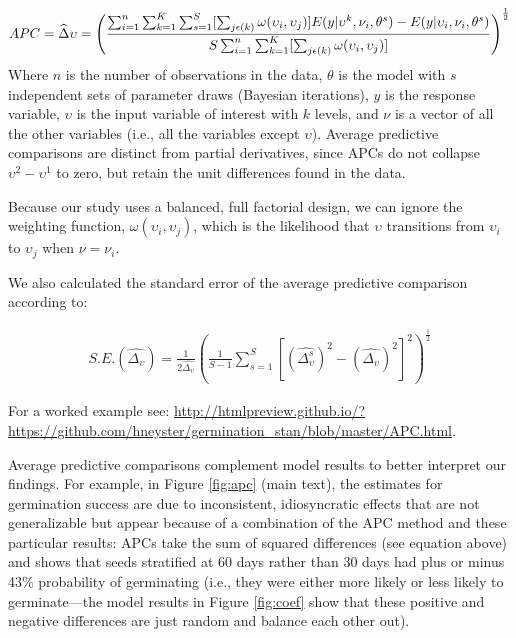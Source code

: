 \documentclass[12pt]{article}\usepackage[]{graphicx}\usepackage[]{color}
\begin{document}
\begin{align}
APC = \widehat{\Delta} \upsilon =  \left( \frac{\sum_{i=1}^{n} \sum_{k=1}^{K} \sum_{s=1}^{S} [\sum_{j\space \epsilon(k)} \omega(\upsilon_i,\upsilon_j)]E(y|\upsilon^{k}, \nu_i,\theta^s) - E(y|\upsilon_i, \nu_i,\theta^s)} {S \sum_{i=1}^{n} \sum_{k=1}^{K}[\sum_{j\space \epsilon(k)} \omega(\upsilon_i,\upsilon_j)]} \right) ^{\frac{1}{2}}
\end{align}
Where $n$ is the number of observations in the data, $\theta$ is the model with $s$ independent sets of parameter draws (Bayesian iterations), $y$ is the response variable, $\upsilon$ is the input variable of interest with $k$ levels, and $\nu$ is a vector of all the other variables (i.e., all the variables except $\upsilon$). 
Average predictive comparisons are distinct from partial derivatives, since APCs do not collapse $\upsilon^{2} - \upsilon^{1}$ to zero, but retain the unit differences found in the data. 

Because our study uses a balanced, full factorial design, we can ignore the weighting function, $\omega(\upsilon_i,\upsilon_j)$, which is the likelihood that $\upsilon$ transitions from $\upsilon_i$ to $\upsilon_j$ when $\nu = \nu_i$. 

We also calculated the standard error of the average predictive comparison according to: 

\begin{align}
S.E.(\widehat{\Delta_\upsilon})=\frac{1}{2 \widehat{\Delta_\upsilon}}\left( \frac{1}{S-1} \sum_{s=1}^S[(\widehat{\Delta_\upsilon^s})^2-(\widehat{\Delta_\upsilon})^2]^{2} \right)^{\frac{1}{2}}
\end{align}

For a worked example see: \url{http://htmlpreview.github.io/?https://github.com/hneyster/germination_stan/blob/master/APC.html}.


Average predictive comparisons complement model results to better interpret our findings. For example, in Figure \ref{fig:apc} (main text),
the estimates for germination success are due to inconsistent,
idiosyncratic effects that are not generalizable but appear because of a
combination of the APC method and these particular results: APCs take
the sum of squared differences (see equation above) and shows that seeds stratified at 60 days rather
than 30 days had plus or minus 43\% probability of germinating (i.e.,
they were either more likely or less likely to germinate---the model
results in Figure \ref{fig:coef} show that these positive and negative differences are just random and
balance each other out).
\printbibliography
\end{document}
